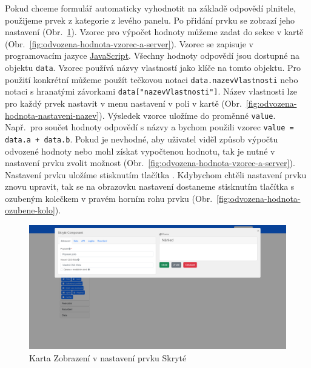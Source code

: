 Pokud chceme formulář automaticky vyhodnotit na základě odpovědí plnitele, použijeme prvek  z kategorie  z levého panelu.
Po přidání prvku se zobrazí jeho nastavení (Obr.~\ref{fig:odvozena-hodnota-nastaveni}).
Vzorec pro výpočet hodnoty můžeme zadat do sekce  v kartě  (Obr.~\ref{fig:odvozena-hodnota-vzorec-a-server}).
Vzorec se zapisuje v programovacím jazyce \href{https://developer.mozilla.org/en-US/docs/Web/JavaScript}{JavaScript}.
Všechny hodnoty odpovědí jsou dostupné na objektu \texttt{data}.
Vzorec používá názvy vlastností jako klíče na tomto objektu.
Pro použití konkrétní můžeme použít tečkovou notaci \texttt{data.nazevVlastnosti} nebo notaci s hranatými závorkami \texttt{data["nazevVlastnosti"]}.
Název vlastnosti lze pro každý prvek nastavit v menu nastavení v poli  v kartě  (Obr.~\ref{fig:odvozena-hodnota-nastaveni-nazev}).
Výsledek vzorce uložíme do proměnné \texttt{value}.
Např.\ pro součet hodnoty odpovědí s názvy  a  bychom použili vzorec \texttt{value = data.a + data.b}.
Pokud je nevhodné, aby uživatel viděl způsob výpočtu odvozené hodnoty nebo mohl získat vypočtenou hodnotu, tak je nutné v nastavení prvku zvolit možnost  (Obr.~\ref{fig:odvozena-hodnota-vzorec-a-server}).
Nastavení prvku uložíme stisknutím tlačítka .
Kdybychom chtěli nastavení prvku znovu upravit, tak se na obrazovku nastavení dostaneme stisknutím tlačítka s ozubeným kolečkem v pravém horním rohu prvku (Obr.~\ref{fig:odvozena-hodnota-ozubene-kolo}).

\begin{figure}[H]
    \centering
    \includegraphics[width=\textwidth]{../img/screenshots/odvozena-hodnota-nastaveni}
    \caption{Karta Zobrazení v nastavení prvku Skryté}\label{fig:odvozena-hodnota-nastaveni}
\end{figure}

